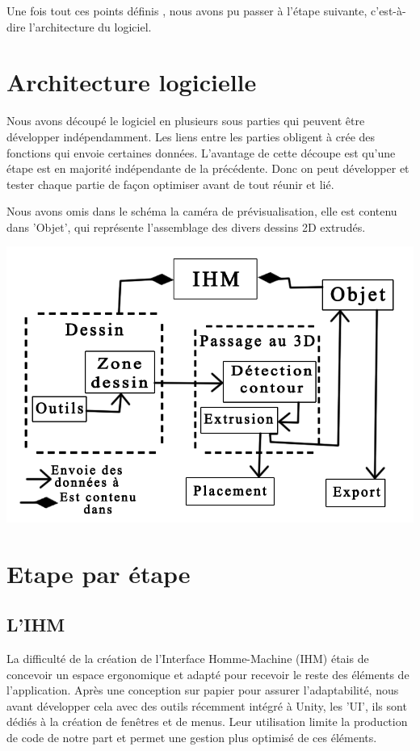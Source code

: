 \documentclass[a4paper,11pt]{article}
\begin{document}
		Une fois tout ces points définis , nous avons pu passer à l'étape suivante, c'est-à-dire l'architecture du logiciel.
		
	\section{Architecture logicielle}
		Nous avons découpé le logiciel en plusieurs sous parties qui peuvent être développer indépendamment. Les liens entre les parties obligent à crée des fonctions qui envoie certaines données. L'avantage de cette découpe est qu'une étape est en majorité indépendante de la précédente. Donc on peut développer et tester chaque partie de façon optimiser avant de tout réunir et lié.
		
		Nous avons omis dans le schéma la caméra de prévisualisation, elle est contenu dans
		'Objet', qui représente l'assemblage des divers dessins 2D extrudés.

				\centerline{\includegraphics[scale=0.5]{images/archi.png}}


	\section{Etape par étape}
		\subsection{L'IHM}
			La difficulté de la création de l'Interface Homme-Machine (IHM) étais de concevoir un espace ergonomique et adapté pour recevoir le reste des éléments de l'application. Après une conception sur papier pour assurer l'adaptabilité, nous avant développer cela avec des outils récemment intégré à Unity, les 'UI', ils sont dédiés à la création de fenêtres et de menus. Leur utilisation limite la production de code de notre part et permet une gestion plus optimisé de ces éléments.
			
\end{document}
